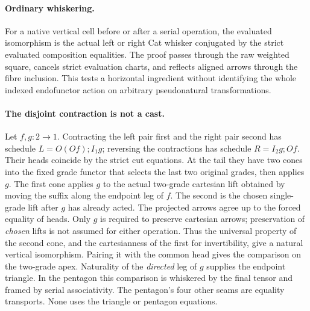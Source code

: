\documentclass[11pt]{article}
\begin{document}
\paragraph{Ordinary whiskering.}
For a native vertical cell before or after a serial operation, the evaluated isomorphism is the actual left or right Cat whisker conjugated by the strict evaluated composition equalities. The proof passes through the raw weighted square, cancels strict evaluation charts, and reflects aligned arrows through the fibre inclusion. This tests a horizontal ingredient without identifying the whole indexed endofunctor action on arbitrary pseudonatural transformations.
\paragraph{The disjoint contraction is not a cast.}
Let $f,g:2\to1$. Contracting the left pair first and the right pair second has schedule $L=O(Of);I_1g$; reversing the contractions has schedule $R=I_2 g;Of$. Their heads coincide by the strict cut equations. At the tail they have two cones into the fixed grade functor that selects the last two original grades, then applies $g$. The first cone applies $g$ to the actual two-grade cartesian lift obtained by moving the suffix along the endpoint leg of $f$. The second is the chosen single-grade lift after $g$ has already acted. The projected arrows agree up to the forced equality of heads. Only $g$ is required to preserve cartesian arrows; preservation of \emph{chosen} lifts is not assumed for either operation. Thus the universal property of the second cone, and the cartesianness of the first for invertibility, give a natural vertical isomorphism. Pairing it with the common head gives the comparison on the two-grade apex. Naturality of the \emph{directed} leg of $g$ supplies the endpoint triangle. In the pentagon this comparison is whiskered by the final tensor and framed by serial associativity. The pentagon's four other seams are equality transports. None uses the triangle or pentagon equations.
\end{document}
